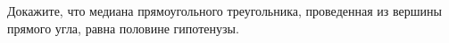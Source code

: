 \begin{ex}
	\begin{condition}
		Докажите, что медиана прямоугольного треугольника, проведенная из вершины прямого угла, равна половине гипотенузы.
	\end{condition}
\end{ex}